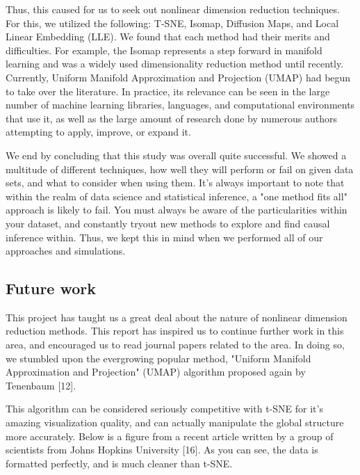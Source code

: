 \documentclass[11pt]{article}
\begin{document}
Thus, this caused for us to seek out nonlinear dimension reduction techniques. For this, we utilized the following: T-SNE, Isomap, Diffusion Maps, and Local Linear Embedding (LLE). We found that each method had their merits and difficulties. For example, the Isomap represents a step forward in manifold learning and was a widely used dimensionality reduction method until recently. Currently, Uniform Manifold Approximation and Projection (UMAP) had begun to take over the literature. In practice, its relevance can be seen in the large number of machine learning libraries, languages, and computational environments that use it, as well as the large amount of research done by numerous authors attempting to apply, improve, or expand it.

We end by concluding that this study was overall quite successful. We showed a multitude of different techniques, how well they will perform or fail on given data sets, and what to consider when using them. It's always important to note that within the realm of data science and statistical inference, a "one method fits all" approach is likely to fail. You must always be aware of the particularities within your dataset, and constantly tryout new methods to explore and find causal inference within. Thus, we kept this in mind when we performed all of our approaches and simulations.

\subsection{Future work}
\hspace{5mm}This project has taught us a great deal about the nature of nonlinear dimension reduction methods. This report has inspired us to continue further work in this area, and encouraged us to read journal papers related to the area. In doing so, we stumbled upon the evergrowing popular method, "Uniform Manifold Approximation and Projection" (UMAP) algorithm proposed again by Tenenbaum [12].

This algorithm can be considered seriously competitive with t-SNE for it's amazing visualization quality, and can actually manipulate the global structure more accurately. Below is a figure from a recent article written by a group of scientists from Johns Hopkins University [16]. As you can see, the data is formatted perfectly, and is much cleaner than t-SNE. 
\end{document}
